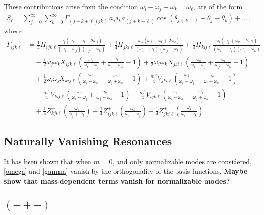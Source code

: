 \documentclass[letterpaper,11pt]{article}
\newcommand{\oi}{\omega_i}
\newcommand{\oj}{\omega_j}
\newcommand{\ok}{\omega_k}
\newcommand{\ol}{\omega_\ell}
\newcommand{\thj}{\theta_j}
\newcommand{\thk}{\theta_k}
\begin{document}
These contributions arise from the condition $\oi - \oj - \ok = \ol$, are of the form
\begin{align}
S_\ell = \sum_{j=0}^\infty \sum_{k=0}^\infty \Gamma_{(j+k+\ell) jk\ell} \, a_j a_k a_{(j+k+\ell)} \cos \left( \theta_{j+k+\ell} - \thj - \thk \right) + \ldots \, ,
\end{align}
where
\begin{align}
\label{gamma}
\Gamma_{ijk\ell} &= \frac{1}{4} H_{ijk\ell} \frac{\oj (\ok - \oi + 2\oj)}{(\oi - \oj)(\oj + \ok)} + \frac{1}{4} H_{jki\ell} \frac{\ok (\oj - \oi + 2\ok)}{(\oi - \ok)(\oj + \ok)} + \frac{1}{4} H_{kij\ell} \frac{\oi (\oj + \ok - 2\oi)}{(\oi - \oj)(\oi - \ok)} \nonumber \\
% 
& \quad -\frac{1}{2} \oj \ok X_{ijk\ell} \left( \frac{\ok}{\oi - \oj} + \frac{\oj}{\oi - \ok} - 1\right) + \frac{1}{2} \oi \ok X_{jki\ell} \left( \frac{\ok}{\oi - \oj} + \frac{\oi}{\oj + \ok} - 1 \right) \nonumber \\
%
& \quad + \frac{1}{2} \oi \oj X_{kij\ell} \left( \frac{\oj}{\oi - \ok} + \frac{\oi}{\oj + \ok} -1 \right) + \frac{m^2}{4} V_{jki\ell} \left( \frac{\oj}{\oi - \oj} + \frac{\ok}{\oi - \ok} -1\right) \nonumber \\
%
& \quad - \frac{m^2}{4} V_{kij\ell} \left( \frac{\oi}{\oi - \oj} + \frac{\ok}{\oj + \ok} + 1\right) - \frac{m^2}{4} V_{ijk\ell} \left( \frac{\oi}{\oi - \ok} + \frac{\oj}{\oj + \ok} + 1 \right) \nonumber \\
%
& \quad + \frac{1}{4} Z^-_{kji\ell} \left( \frac{\oi}{\oj + \ok}\right) - \frac{1}{4} Z^+_{ijk\ell} \left( \frac{\ok}{\oi - \oj} \right) - \frac{1}{4} Z^+_{jki\ell} \left( \frac{\oj}{\oi - \ok}\right) \, .
\end{align}


\subsection{Naturally Vanishing Resonances}

It has been shown that when $m=0$, and only normalizable modes are considered, \eqref{omega} and \eqref{gamma} vanish by the orthogonality of the basis functions. {\bf Maybe show that mass-dependent terms vanish for normalizable modes?}


\subsection{$(++-)$}
\label{subs: ttf resonances}
\end{document}
